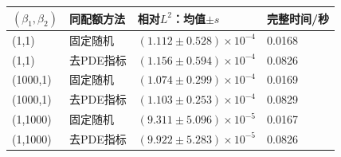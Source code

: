 \begin{tabular}{llll}\toprule
$(\beta_1,\beta_2)$ & 同配额方法 & 相对$L^2$：均值$\pm s$ & 完整时间/秒 \\ \midrule
(1,1) & 固定随机 & $(1.112\pm0.528)\times10^{-4}$ & 0.0168 \\
(1,1) & 去PDE指标 & $(1.156\pm0.594)\times10^{-4}$ & 0.0826 \\
(1000,1) & 固定随机 & $(1.074\pm0.299)\times10^{-4}$ & 0.0169 \\
(1000,1) & 去PDE指标 & $(1.103\pm0.253)\times10^{-4}$ & 0.0829 \\
(1,1000) & 固定随机 & $(9.311\pm5.096)\times10^{-5}$ & 0.0167 \\
(1,1000) & 去PDE指标 & $(9.922\pm5.283)\times10^{-5}$ & 0.0826 \\
\bottomrule\end{tabular}
